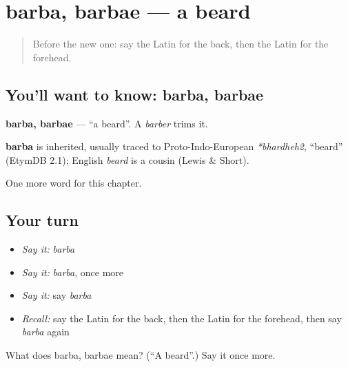 \section[barba, barbae]{barba, barbae — a beard}

\label{lesson:LA-C65-barba}



\begin{quote}
Before the new one: say the Latin for the back, then the Latin for the forehead.
\end{quote}

\subsection*{You'll want to know: barba, barbae}
\textbf{barba, barbae} — \textquotedblleft{}a beard\textquotedblright{}. A \emph{barber} trims it.

\begin{cousinweb}
\textbf{barba} is inherited, usually traced to Proto-Indo-European \emph{*bhardheh2}, \textquotedblleft{}beard\textquotedblright{} (EtymDB 2.1); English \emph{beard} is a cousin (Lewis \& Short).
\end{cousinweb}

\begin{grammarlens}[title={What you've built}]
One more word for this chapter.
\end{grammarlens}

\subsection*{Your turn}
\begin{itemize}
\raggedright
  \item \emph{Say it:} \emph{barba}
  \item \emph{Say it:} \emph{barba}, once more
  \item \emph{Say it:} say \emph{barba}
  \item \emph{Recall:} say the Latin for the back, then the Latin for the forehead, then say \emph{barba} again
\end{itemize}

\begin{tcolorbox}[breakable,colback=teal!4,colframe=teal!35!black,title={Before you move on}]
What does barba, barbae mean? (\textquotedblleft{}A beard\textquotedblright{}.) Say it once more.
\end{tcolorbox}
